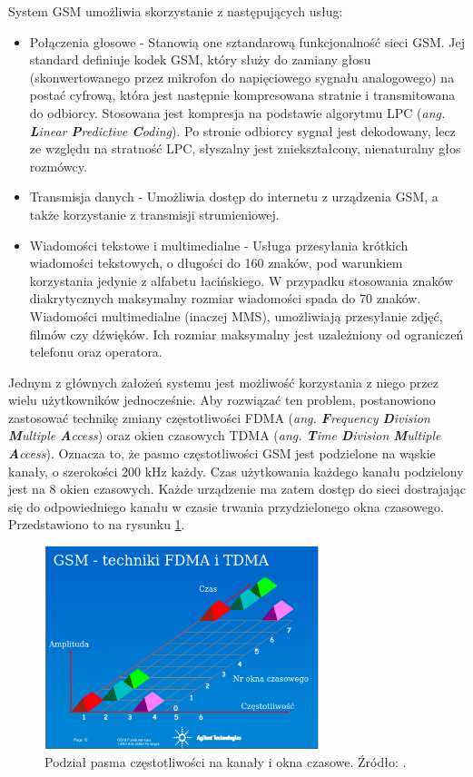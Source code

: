 System GSM umożliwia skorzystanie z następujących usług:
\begin{itemize}
	\item Połączenia głosowe - Stanowią one sztandarową funkcjonalność sieci GSM. Jej standard definiuje kodek GSM, który służy do zamiany głosu (skonwertowanego przez mikrofon do napięciowego sygnału analogowego) na postać cyfrową, która jest następnie kompresowana stratnie i transmitowana do odbiorcy. Stosowana jest kompresja na podstawie algorytmu LPC (\textit{ang. \textbf{L}inear \textbf{P}redictive \textbf{C}oding}). Po stronie odbiorcy sygnał jest dekodowany, lecz ze względu na stratność LPC, słyszalny jest zniekształcony, nienaturalny głos rozmówcy.
	\item Transmisja danych - Umożliwia dostęp do internetu z urządzenia GSM, a także korzystanie z transmisji strumieniowej.
	\pagebreak
	\item Wiadomości tekstowe i multimedialne - Usługa przesyłania krótkich wiadomości tekstowych, o długości do 160 znaków, pod warunkiem korzystania jedynie z alfabetu łacińskiego. W przypadku stosowania znaków diakrytycznych maksymalny rozmiar wiadomości spada do 70 znaków. Wiadomości multimedialne (inaczej MMS), umożliwiają przesyłanie zdjęć, filmów czy dźwięków. Ich rozmiar maksymalny jest uzależniony od ograniczeń telefonu oraz operatora.
\end{itemize}

Jednym z głównych założeń systemu jest możliwość korzystania z niego przez wielu użytkowników jednocześnie. Aby rozwiązać ten problem, postanowiono zastosować technikę zmiany częstotliwości FDMA (\textit{ang. \textbf{F}requency \textbf{D}ivision \textbf{M}ultiple \textbf{A}ccess}) oraz okien czasowych TDMA (\textit{ang. \textbf{T}ime \textbf{D}ivision \textbf{M}ultiple \textbf{A}ccess}). Oznacza to, że pasmo częstotliwości GSM jest podzielone na wąskie kanały, o szerokości 200 kHz każdy. Czas użytkowania każdego kanału podzielony jest na 8 okien czasowych. Każde urządzenie ma zatem dostęp do sieci dostrajając się do odpowiedniego kanału w czasie trwania przydzielonego okna czasowego. Przedstawiono to na rysunku \ref{fig:image_gsm_frequencies_timeslots}.

\begin{figure}[H]
	\centering
	\includegraphics[width=8cm]{img/theory/GSM/gsm_timeslots_frequencies.png}
	\caption{Podział pasma częstotliwości na kanały i okna czasowe. Źródło: \cite{GSM}.}
	\label{fig:image_gsm_frequencies_timeslots}
\end{figure}


